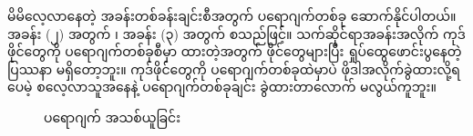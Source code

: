 မိမိလေ့လာနေတဲ့ အခန်းတစ်ခန်းချင်းစီအတွက် ပရောဂျက်တစ်ခု ဆောက်နိုင်ပါတယ်။ အခန်း (၂) အတွက်  ၊ အခန်း (၃) အတွက်  စသည်ဖြင့်။  သက်ဆိုင်ရာအခန်းအလိုက် ကုဒ်ဖိုင်တွေကို ပရောဂျက်တစ်ခုစီမှာ ထားတဲ့အတွက် ဖိုင်တွေများပြီး ရှုပ်ထွေဖောင်းပွနေတဲ့ ပြဿနာ မရှိတော့ဘူး။ ကုဒ်ဖိုင်တွေကို ပရောဂျက်တစ်ခုထဲမှာပဲ ဖိုဒါအလိုက်ခွဲထားလို့ရပေမဲ့ စလေ့လာသူအနေနဲ့ ပရောဂျက်တစ်ခုချင်း ခွဲထားတာလောက် မလွယ်ကူဘူး။

\begin{figure}[tb!]
\caption{ပရောဂျက် အသစ်ယူခြင်း} 
\label{fig:new_proj}
\end{figure}

